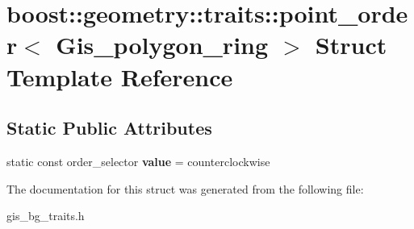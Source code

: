 \hypertarget{structboost_1_1geometry_1_1traits_1_1point__order_3_01Gis__polygon__ring_01_4}{}\section{boost\+:\+:geometry\+:\+:traits\+:\+:point\+\_\+order$<$ Gis\+\_\+polygon\+\_\+ring $>$ Struct Template Reference}
\label{structboost_1_1geometry_1_1traits_1_1point__order_3_01Gis__polygon__ring_01_4}
\subsection*{Static Public Attributes}
\begin{DoxyCompactItemize}
\item 
\mbox{\label{structboost_1_1geometry_1_1traits_1_1point__order_3_01Gis__polygon__ring_01_4_a4d6a1cc3d74dcbf126cbbea41d59bcf3}} 
static const order\+\_\+selector {\bfseries value} = counterclockwise
\end{DoxyCompactItemize}


The documentation for this struct was generated from the following file\+:\begin{DoxyCompactItemize}
\item 
gis\+\_\+bg\+\_\+traits.\+h\end{DoxyCompactItemize}
